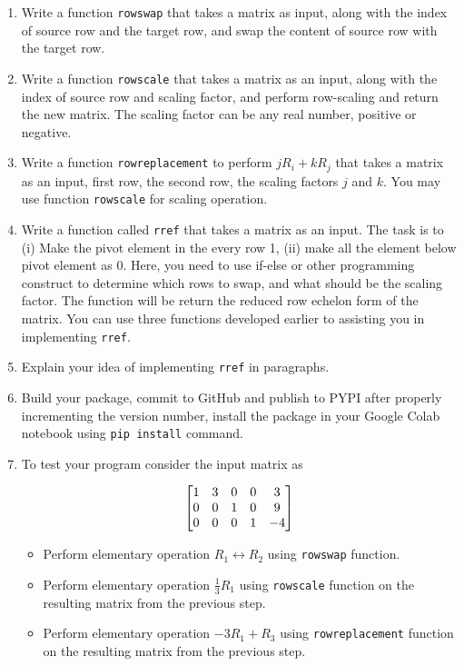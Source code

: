 \documentclass[12pt, xcolor=dvipsnames,svgnames,x11names]{article}
\makeatletter
\newenvironment{multiequation}[1][]{%
\begin{equation}%
   \begin{aligned}%
   \ifx#1\@empty\else\label{#1}\fi%
}{%
   \end{aligned}%
\end{equation}%
}
\makeatother
\begin{document}
\begin{enumerate}
   \item Write a function \texttt{rowswap} that takes a matrix as input, along with the index of source row and the target row, and swap the content of source row with the target row.
   \item Write a function \texttt{rowscale} that takes a matrix as an input, along with the index of source row and scaling factor, and perform row-scaling and return the new matrix. The scaling factor can be any real number, positive or negative.
   \item Write a function \texttt{rowreplacement} to perform $jR_i + kR_j$ that takes a matrix as an input, first row, the second row, the scaling factors $j$ and $k$. You may use function \texttt{rowscale} for scaling operation.
   \item Write a function called \texttt{rref} that takes a matrix as an input. The task is to (i) Make the pivot element in the every row 1, (ii) make all the element below pivot element as 0. Here, you need to use if-else or other programming construct to determine which rows to swap, and what should be the scaling factor. The function will be return the reduced row echelon form of the matrix. You can use three functions developed earlier to assisting you in implementing \texttt{rref}.
   \item Explain your idea of implementing \texttt{rref} in paragraphs.
   \item Build your package, commit to GitHub and publish to PYPI after properly incrementing the version number, install the package in your Google Colab notebook using \texttt{pip install} command.
   \item To test your program consider the input matrix as 
   
   \begin{multiequation}
      \begin{bmatrix}
      1 & 3 & 0 & 0 & 3\\
      0 & 0 & 1 & 0 & 9\\
      0 & 0 & 0 & 1 & -4
   \end{bmatrix}
   \end{multiequation}

   \begin{itemize}
      \item Perform elementary operation $R_1 \leftrightarrow  R_2$  using \texttt{rowswap} function.
      \item Perform elementary operation $\frac{1}{3}R_1$  using \texttt{rowscale} function on the resulting matrix from the previous step.
      \item Perform elementary operation $-3R_1 + R_3$  using \texttt{rowreplacement} function on the resulting matrix from the previous step.
   \end{itemize}
\end{enumerate}
\end{document}
